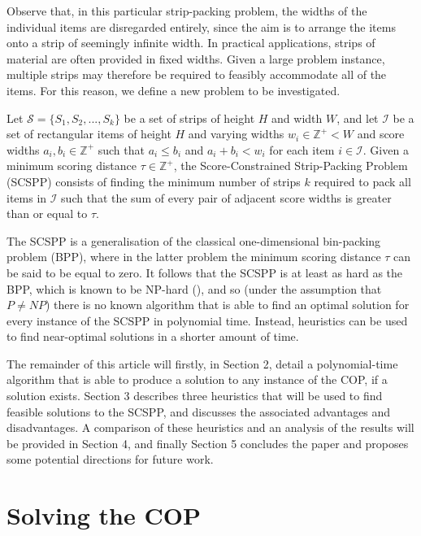 \documentclass[oribibl]{llncs}
\begin{document}
Observe that, in this particular strip-packing problem, the widths of the individual items are disregarded entirely, since the aim is to arrange the items onto a strip of seemingly infinite width. In practical applications, strips of material are often provided in fixed widths. Given a large problem instance, multiple strips may therefore be required to feasibly accommodate all of the items. For this reason, we define a new problem to be investigated.


\begin{definition}
	\label{defn:scspp}
	Let $\mathcal{S} = \{S_1, S_2, ..., S_k\}$ be a set of strips of height $H$ and width $W$, and let $\mathcal{I}$ be a set of rectangular items of height $H$ and varying widths $w_i \in \mathbb{Z}^+ < W$ and score widths $a_i, b_i \in \mathbb{Z}^+$ such that $a_i \leq b_i$ and $a_i + b_i < w_i$ for each item $i \in \mathcal{I}$. Given a minimum scoring distance $\tau \in \mathbb{Z}^+$, the Score-Constrained Strip-Packing Problem (SCSPP) consists of finding the minimum number of strips $k$ required to pack all items in $\mathcal{I}$ such that the sum of every pair of adjacent score widths is greater than or equal to $\tau$.
\end{definition}


The SCSPP is a generalisation of the classical one-dimensional bin-packing problem (BPP), where in the latter problem the minimum scoring distance $\tau$ can be said to be equal to zero. It follows that the SCSPP is at least as hard as the BPP, which is known to be NP-hard (\citealp{garey1979}), and so (under the assumption that $P \neq NP$) there is no known algorithm that is able to find an optimal solution for every instance of the SCSPP in polynomial time. Instead, heuristics can be used to find near-optimal solutions in a shorter amount of time.


The remainder of this article will firstly, in Section 2, detail a polynomial-time algorithm that is able to produce a solution to any instance of the COP, if a solution exists. Section 3 describes three heuristics that will be used to find feasible solutions to the SCSPP, and discusses the associated advantages and disadvantages. A comparison of these heuristics and an analysis of the results will be provided in Section 4, and finally Section 5 concludes the paper and proposes some potential directions for future work.


\section{Solving the COP}
\label{sec:ahca}
\end{document}
